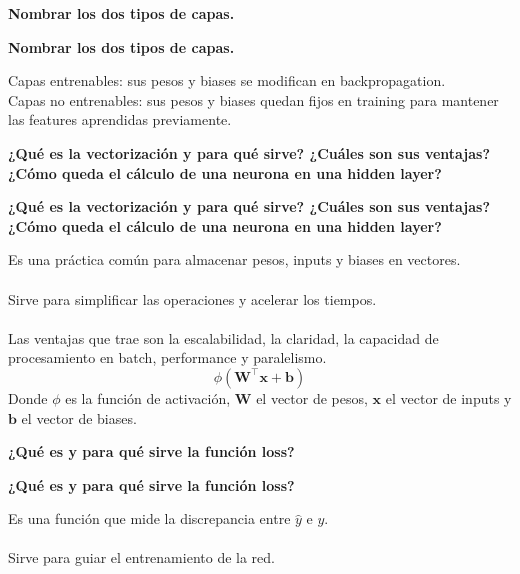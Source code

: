 \documentclass[10pt]{memoir}
\begin{document}
\clearpage
\begin{center}
	\textbf{\Large Nombrar los dos tipos de capas.} \\
\end{center}

\clearpage
\begin{center}
	\textbf{\Large Nombrar los dos tipos de capas.} \\
\end{center}
\noindent Capas entrenables: sus pesos y biases se modifican en backpropagation. \\
Capas no entrenables: sus pesos y biases quedan fijos en training para mantener las features aprendidas previamente.

\clearpage
\begin{center}
	\textbf{\Large ¿Qué es la vectorización y para qué sirve? ¿Cuáles son sus ventajas? ¿Cómo queda el cálculo de una neurona en una hidden layer?} \\
\end{center}

\clearpage
\begin{center}
	\textbf{\Large ¿Qué es la vectorización y para qué sirve? ¿Cuáles son sus ventajas? ¿Cómo queda el cálculo de una neurona en una hidden layer?}
\end{center}
\noindent Es una práctica común para almacenar pesos, inputs y biases en vectores. \\
\\
Sirve para simplificar las operaciones y acelerar los tiempos. \\
\\
Las ventajas que trae son la escalabilidad, la claridad, la capacidad de procesamiento en batch, performance y paralelismo.
\[\phi(\mathbf{W}^{\top}\mathbf{x}+\mathbf{b})\]
Donde $\phi$ es la función de activación, $\mathbf{W}$ el vector de pesos, $\mathbf{x}$ el vector de inputs y $\mathbf{b}$ el vector de biases.

\clearpage
\begin{center}
	\textbf{\Large ¿Qué es y para qué sirve la función loss?} \\
\end{center}

\clearpage
\begin{center}
	\textbf{\Large ¿Qué es y para qué sirve la función loss?} \\
\end{center}
\noindent Es una función que mide la discrepancia entre \(\hat{y}\) e $y$. \\
\\
\noindent Sirve para guiar el entrenamiento de la red.
\end{document}

